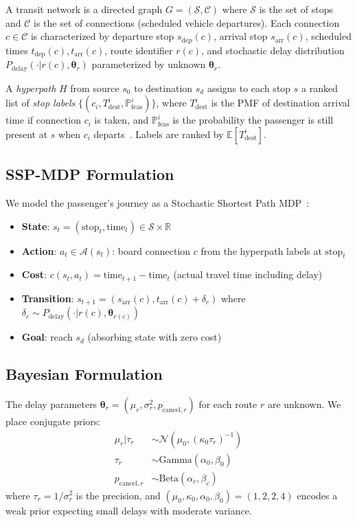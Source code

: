 \documentclass[journal]{IEEEtran}
\begin{document}
A transit network is a directed graph $G = (\mathcal{S}, \mathcal{C})$ where $\mathcal{S}$ is the set of stops and $\mathcal{C}$ is the set of connections (scheduled vehicle departures). Each connection $c \in \mathcal{C}$ is characterized by departure stop $s_{\mathrm{dep}}(c)$, arrival stop $s_{\mathrm{arr}}(c)$, scheduled times $t_{\mathrm{dep}}(c), t_{\mathrm{arr}}(c)$, route identifier $r(c)$, and stochastic delay distribution $P_{\mathrm{delay}}(\cdot | r(c), \bm{\theta}_r)$ parameterized by unknown $\bm{\theta}_r$.

A \emph{hyperpath} $H$ from source $s_0$ to destination $s_d$ assigns to each stop $s$ a ranked list of \emph{stop labels} $\{(c_i, T_{\mathrm{dest}}^i, \mathbb{P}_{\mathrm{feas}}^i)\}$, where $T_{\mathrm{dest}}^i$ is the PMF of destination arrival time if connection $c_i$ is taken, and $\mathbb{P}_{\mathrm{feas}}^i$ is the probability the passenger is still present at $s$ when $c_i$ departs~\cite{durner2024}. Labels are ranked by $\mathbb{E}[T_{\mathrm{dest}}^i]$.

\subsection{SSP-MDP Formulation}

We model the passenger's journey as a Stochastic Shortest Path MDP~\cite{bertsekas1991}:
\begin{itemize}
    \item \textbf{State}: $s_t = (\text{stop}_t, \text{time}_t) \in \mathcal{S} \times \mathbb{R}$
    \item \textbf{Action}: $a_t \in \mathcal{A}(s_t)$: board connection $c$ from the hyperpath labels at $\text{stop}_t$
    \item \textbf{Cost}: $c(s_t, a_t) = \text{time}_{t+1} - \text{time}_t$ (actual travel time including delay)
    \item \textbf{Transition}: $s_{t+1} = (s_{\mathrm{arr}}(c), t_{\mathrm{arr}}(c) + \delta_c)$ where $\delta_c \sim P_{\mathrm{delay}}(\cdot | r(c), \bm{\theta}_{r(c)})$
    \item \textbf{Goal}: reach $s_d$ (absorbing state with zero cost)
\end{itemize}

\subsection{Bayesian Formulation}

The delay parameters $\bm{\theta}_r = (\mu_r, \sigma_r^2, p_{\mathrm{cancel},r})$ for each route $r$ are unknown. We place conjugate priors:
\begin{align}
    \mu_r | \tau_r &\sim \mathcal{N}(\mu_0, (\kappa_0 \tau_r)^{-1}) \label{eq:prior_mu}\\
    \tau_r &\sim \text{Gamma}(\alpha_0, \beta_0) \label{eq:prior_tau}\\
    p_{\mathrm{cancel},r} &\sim \text{Beta}(\alpha_c, \beta_c) \label{eq:prior_cancel}
\end{align}
where $\tau_r = 1/\sigma_r^2$ is the precision, and $(\mu_0, \kappa_0, \alpha_0, \beta_0) = (1, 2, 2, 4)$ encodes a weak prior expecting small delays with moderate variance.
\end{document}
